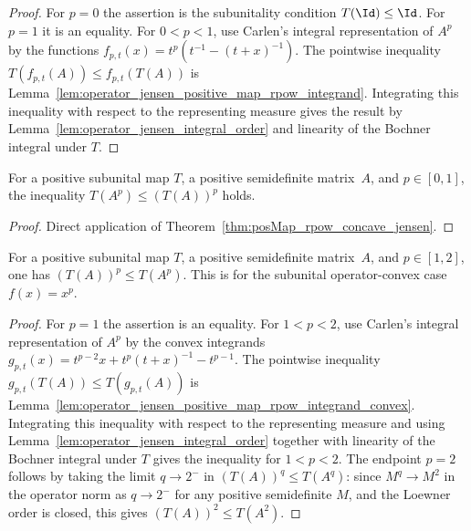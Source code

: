 \begin{proof}\leanok
    For $p=0$ the assertion is the subunitality condition
    $T(\Id)\le\Id$. For $p=1$ it is an equality. For $0<p<1$, use Carlen's
    integral representation of $A^p$ by the functions
    $f_{p,t}(x)=t^p(t^{-1}-(t+x)^{-1})$. The pointwise inequality
    $T(f_{p,t}(A))\le f_{p,t}(T(A))$ is
    Lemma~\ref{lem:operator_jensen_positive_map_rpow_integrand}. Integrating
    this inequality with respect to the representing measure gives the result
    by Lemma~\ref{lem:operator_jensen_integral_order} and linearity of the
    Bochner integral under $T$.
\end{proof}

\begin{theorem}\label{thm:rpow_concave_jensen}
    \leanok
    For a positive subunital map $T$, a positive semidefinite matrix~$A$,
    and $p\in[0,1]$, the inequality $T(A^p)\le(T(A))^p$ holds.
\end{theorem}

\begin{proof}\leanok
    Direct application of Theorem~\ref{thm:posMap_rpow_concave_jensen}.
\end{proof}

\begin{theorem}\label{thm:posMap_rpow_convex_jensen}
    \leanok
    For a positive subunital map $T$, a positive semidefinite matrix~$A$,
    and $p\in[1,2]$, one has $(T(A))^p\le T(A^p)$.
    This is \cite[Theorem~5.11]{Wolf2012Quantum} for the subunital
    operator-convex case $f(x)=x^p$.
\end{theorem}

\begin{proof}\leanok
    For $p=1$ the assertion is an equality. For $1<p<2$, use Carlen's
    integral representation of $A^p$ by the convex integrands
    $g_{p,t}(x)=t^{p-2}x+t^p(t+x)^{-1}-t^{p-1}$. The pointwise inequality
    $g_{p,t}(T(A))\le T(g_{p,t}(A))$ is
    Lemma~\ref{lem:operator_jensen_positive_map_rpow_integrand_convex}.
    Integrating this inequality with respect to the representing measure and
    using Lemma~\ref{lem:operator_jensen_integral_order} together with linearity
    of the Bochner integral under $T$ gives the inequality for $1<p<2$. The
    endpoint $p=2$ follows by taking the limit $q\to2^-$ in
    $(T(A))^q\le T(A^q)$: since $M^q\to M^2$ in the operator norm as
    $q\to2^-$ for any positive semidefinite $M$, and the Loewner order is
    closed, this gives $(T(A))^2\le T(A^2)$.
\end{proof}


